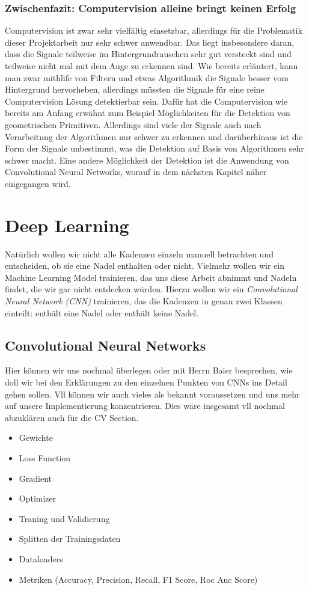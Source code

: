 \documentclass[11pt, a4paper]{article}
\begin{document}
\subsubsection{Zwischenfazit: Computervision alleine bringt keinen Erfolg}
Computervision ist zwar sehr vielfältig einsetzbar, allerdings für die Problematik dieser Projektarbeit nur sehr schwer anwendbar. Das liegt insbesondere daran, dass die Signale teilweise im Hintergrundrauschen sehr gut versteckt sind und teilweise nicht mal mit dem Auge zu erkennen sind. Wie bereits erläutert, kann man zwar mithlife von Filtern und etwas Algorithmik die Signale besser vom Hintergrund hervorheben, allerdings müssten die Signale für eine reine Computervision Lösung detektierbar sein. Dafür hat die Computervision wie bereits am Anfang erwähnt zum Beispiel Möglichkeiten für die Detektion von geometrischen Primitiven. Allerdings sind viele der Signale auch nach Verarbeitung der Algorithmen nur schwer zu erkennen und darüberhinaus ist die Form der Signale unbestimmt, was die Detektion auf Basis von Algorithmen sehr schwer macht. Eine andere Möglichkeit der Detektion ist die Anwendung von Convolutional Neural Networks, worauf in dem nächsten Kapitel näher eingegangen wird.

\section{Deep Learning}
Natürlich wollen wir nicht alle Kadenzen einzeln manuell betrachten und entscheiden, ob sie eine Nadel enthalten oder nicht. Vielmehr wollen wir ein Machine Learning Model trainieren, das uns diese Arbeit abnimmt und Nadeln findet, die wir gar nicht entdecken würden. Hierzu wollen wir ein \emph{Convolutional Neural Network (CNN)} trainieren, das die Kadenzen in genau zwei Klassen einteilt: enthält eine Nadel oder enthält keine Nadel.

\subsection{Convolutional Neural Networks}
Hier können wir uns nochmal überlegen oder mit Herrn Baier besprechen, wie doll wir bei den Erklärungen zu den einzelnen Punkten von CNNs ins Detail gehen sollen. Vll können wir auch vieles als bekannt voraussetzen und uns mehr auf unsere Implementierung konzentrieren. Dies wäre insgesamt vll nochmal abzuklären auch für die CV Section.

\begin{itemize}
	\item Gewichte
	\item Loss Function
	\item Gradient
	\item Optimizer
	\item Traning und Validierung
	\item Splitten der Trainingsdaten
	\item Dataloaders
	\item Metriken (Accuracy, Precision, Recall, F1 Score, Roc Auc Score)
\end{itemize}
\end{document}
